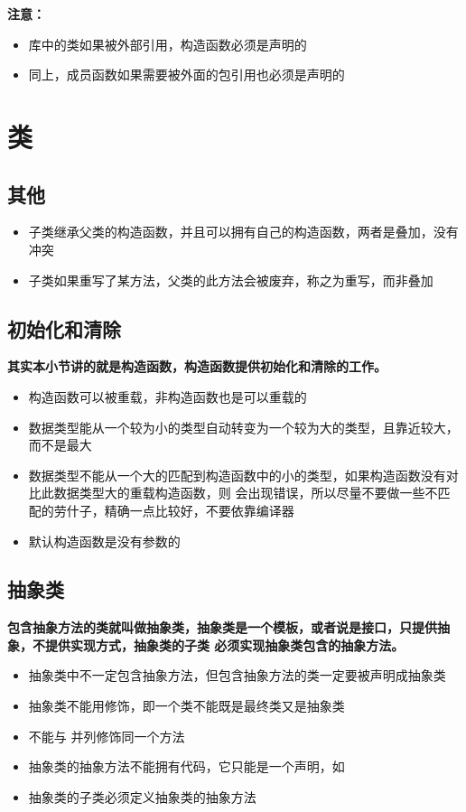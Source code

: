 \documentclass{article}
\begin{document}
\textbf{注意：}
\begin{itemize}
\item 库中的类如果被外部引用，构造函数必须是声明的
\item 同上，成员函数如果需要被外面的包引用也必须是声明的
\end{itemize}


\section{类}
\subsection{其他}
\begin{itemize}
\item 子类继承父类的构造函数，并且可以拥有自己的构造函数，两者是叠加，没有冲突
\item 子类如果重写了某方法，父类的此方法会被废弃，称之为重写，而非叠加
\end{itemize}

\subsection{初始化和清除}
\textbf{
其实本小节讲的就是构造函数，构造函数提供初始化和清除的工作。
}

\begin{itemize}
\item 构造函数可以被重载，非构造函数也是可以重载的
\item 数据类型能从一个较为小的类型自动转变为一个较为大的类型，且靠近较大，而不是最大
\item 数据类型不能从一个大的匹配到构造函数中的小的类型，如果构造函数没有对比此数据类型大的重载构造函数，则
会出现错误，所以尽量不要做一些不匹配的劳什子，精确一点比较好，不要依靠编译器
\item 默认构造函数是没有参数的
\end{itemize}

\subsection{抽象类}
\textbf{
包含抽象方法的类就叫做抽象类，抽象类是一个模板，或者说是接口，只提供抽象，不提供实现方式，抽象类的子类
必须实现抽象类包含的抽象方法。
}
\begin{itemize}
\item 抽象类中不一定包含抽象方法，但包含抽象方法的类一定要被声明成抽象类
\item 抽象类不能用修饰，即一个类不能既是最终类又是抽象类
\item {}不能与 并列修饰同一个方法
\item 抽象类的抽象方法不能拥有代码，它只能是一个声明，如
\item 抽象类的子类必须定义抽象类的抽象方法
\end{itemize}

\begin{verbatim}
\end{verbatim}
\end{document}
